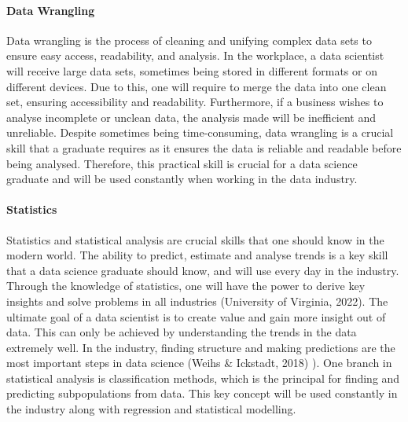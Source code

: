 \documentclass[a4paper, 11pt]{report}
\begin{document}
	\paragraph{Data Wrangling} Data wrangling is the process of cleaning and unifying complex data sets to ensure easy access, readability, and analysis. In the workplace, a data scientist will receive large data sets, sometimes being stored in different formats or on different devices. Due to this, one will require to merge the data into one clean set, ensuring accessibility and readability. Furthermore, if a business wishes to analyse incomplete or unclean data, the analysis made will be inefficient and unreliable. Despite sometimes being time-consuming, data wrangling is a crucial skill that a graduate requires as it ensures the data is reliable and readable before being analysed. Therefore, this practical skill is crucial for a data science graduate and will be used constantly when working in the data industry. 
	
	\paragraph {Statistics} Statistics and statistical analysis are crucial skills that one should know in the modern world. The ability to predict, estimate and analyse trends is a key skill that a data science graduate should know, and will use every day in the industry. Through the knowledge of statistics, one will have the power to derive key insights and solve problems in all industries (University of Virginia, 2022). The ultimate goal of a data scientist is to create value and gain more insight out of data. This can only be achieved by understanding the trends in the data extremely well. In the industry, finding structure and making predictions are the most important steps in data science (Weihs & Ickstadt, 2018)
	). One branch in statistical analysis  is classification methods, which is the principal for finding and predicting subpopulations from data. This key concept will be used constantly in the industry along with regression and statistical modelling. 
	
\end{document}
